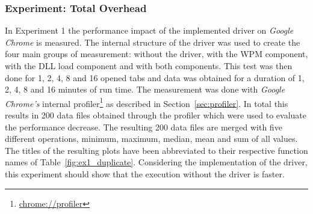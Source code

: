 \subsubsection{Experiment: Total Overhead}
In Experiment 1 the performance impact of the implemented driver on \emph{Google Chrome} is measured. The internal structure of the driver was used to create the four main groups of measurement: without the driver, with the \gls{WPM} component, with the \gls{DLL} load component and with both components. This test was then done for 1, 2, 4, 8 and 16 opened tabs and data was obtained for a duration of 1, 2, 4, 8 and 16 minutes of run time. The measurement was done with \emph{Google Chrome's} internal profiler\footnote{\url{chrome://profiler}} as described in Section~\ref{sec:profiler}. In total this results in 200 data files obtained through the profiler which were used to evaluate the performance decrease. The resulting 200 data files are merged with five different operations, minimum, maximum, median, mean and sum of all values. The titles of the resulting plots have been abbreviated to their respective function names of Table~\ref{fig:ex1_duplicate}. Considering the implementation of the driver, this experiment should show that the execution without the driver is faster.
